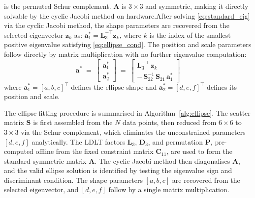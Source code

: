 \documentclass[colorlinks,upint,subscriptcorrection,varvw,hyphenate,balance,greek,russian,vietnamese,german]{asmeconf} %
\begin{document}
is the permuted Schur complement.
$\mathbf{A}$ is $3\times3$ and symmetric, making it directly solvable by the cyclic Jacobi method on hardware.After solving \eqref{eq:standard_eig} via the cyclic Jacobi method, the shape parameters are recovered from the selected eigenvector
$\mathbf{z}_k$ as:
$\mathbf{a}_1^* = \mathbf{L}_3^{-\top}\mathbf{z}_k$,
where $k$ is the index of the smallest positive eigenvalue
satisfying \eqref{eq:ellipse_cond}.
The position and scale parameters follow directly by matrix multiplication with no further eigenvalue computation:
\begin{equation}
	\mathbf{a}^* \;=\;
	\begin{bmatrix}
		\mathbf{a}_1^* \\[4pt]
		\mathbf{a}_2^*
	\end{bmatrix}
	\;=\;
	\begin{bmatrix}
		\mathbf{L}_3^{-\top}\,\mathbf{z}_k \\[4pt]
		-\,\mathbf{S}_{22}^{-1}\,\mathbf{S}_{21}\,\mathbf{a}_1^*
	\end{bmatrix}
	\label{eq:final}
\end{equation}
where $\mathbf{a}_1^* = [a,b,c]^\top$ defines the ellipse shape
and $\mathbf{a}_2^* = [d,e,f]^\top$ defines its position and scale.

The ellipse fitting procedure is summarised in
Algorithm~\ref{alg:ellipse}.
The scatter matrix $\mathbf{S}$ is first assembled
from the $N$ data points, then reduced from $6\times6$
to $3\times3$ via the Schur complement, which eliminates
the unconstrained parameters $[d,e,f]$ analytically.
The LDLT factors $\mathbf{L}_3$, $\mathbf{D}_3$, and
permutation $\mathbf{P}$, pre-computed offline from the
fixed constraint matrix $\mathbf{C}_{11}$, are used to
form the standard symmetric matrix $\mathbf{A}$.
The cyclic Jacobi method then diagonalises $\mathbf{A}$,
and the valid ellipse solution is identified by testing
the eigenvalue sign and discriminant condition.
The shape parameters $[a,b,c]$ are recovered from the
selected eigenvector, and $[d,e,f]$ follow by a single
matrix multiplication.
\end{document}
